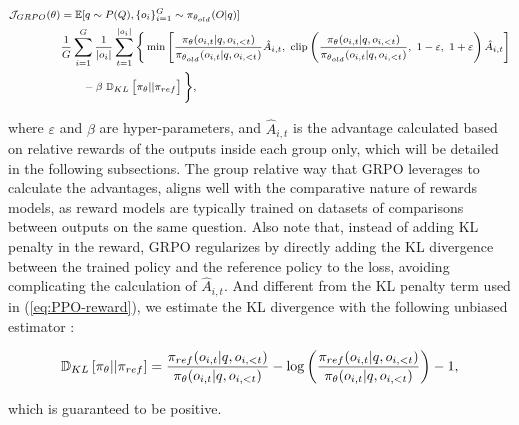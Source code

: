\begin{itemize}[topsep=0pt]
\begin{itemize}[topsep=0pt]
\begin{equation}
\footnotesize
\begin{split}
    \mathcal{J}_{GRPO}(\theta) &= \mathbb{E}{[q \sim P(Q), \{o_i\}_{i=1}^G \sim \pi_{\theta_{old}}(O|q)]}  \\
    & \frac{1}{G}\sum_{i=1}^G\frac{1}{|o_i|} \sum_{t=1}^{|o_i|} \Bigg\{ \min \Bigg[ \frac{\pi_\theta(o_{i,t} | q, o_{i,<t})}{\pi_{\theta_{old}}(o_{i,t} | q, o_{i,<t})} \hat{A}_{i,t},~ \text{clip} \left( \frac{\pi_\theta(o_{i,t} | q, o_{i,<t})}{\pi_{\theta_{old}}(o_{i,t} | q, o_{i,<t})},~ 1 - \varepsilon,~ 1 + \varepsilon \right)  \hat{A}_{i,t} \Bigg] \\
    & \qquad - \beta~ \mathbb{D}_{KL}\left[\pi_{\theta} || \pi_{ref}\right] \Bigg\},
\end{split}
\label{eq:GRPO-obj}
\end{equation}

where $\varepsilon$ and $\beta$ are hyper-parameters, and $\hat{A}_{i,t}$  is the advantage calculated based on relative rewards of the outputs inside each group only, which will be detailed in the following subsections. The group relative way that GRPO leverages to calculate the advantages, aligns well with the comparative nature of rewards models,  as reward models are typically trained on datasets of comparisons between outputs on the same question. Also note that, instead of adding KL penalty in the reward, GRPO regularizes by directly adding the KL divergence between the trained policy and the reference policy to the loss, avoiding complicating the calculation of  $\hat{A}_{i,t}$. And different from the KL penalty term used in (\ref{eq:PPO-reward}), we estimate the KL divergence with the following unbiased estimator \citep{kl_approx}:

\begin{equation}
\small
    \mathbb{D}_{KL}\left[\pi_{\theta} || \pi_{ref}\right] = \frac{\pi_{ref}(o_{i,t}|q,o_{i,<t})}{\pi_{\theta}(o_{i,t}|q,o_{i,<t})} - \log\left(\frac{\pi_{ref}(o_{i,t}|q,o_{i,<t})}{\pi_{\theta}(o_{i,t}|q,o_{i,<t})}\right) - 1,
\end{equation}

which is guaranteed to be positive.


\end{itemize}
\end{itemize}
